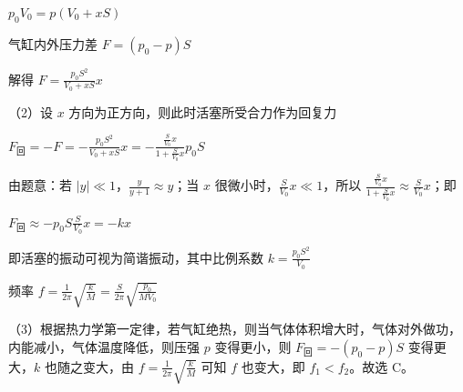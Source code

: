 \documentclass[\gkver]{gaokaozhenti}
\begin{document}
\begin{enumerate}
{$p_{0}V_{0}=p(V_{0}+xS)$

气缸内外压力差 $F=(p_{0}-p)S$

解得 $F=\frac{p_{0}S^{2}}{V_{0}+xS}x$

（2）设 $x$ 方向为正方向，则此时活塞所受合力作为回复力

$F_{\text{回}}=-F=-\frac{p_{0}S^{2}}{V_{0}+xS}x=-\frac{\frac{S}{V_{0}}x}{1+\frac{S}{V_{0}}x}p_{0}S$

由题意：若 $|y|\ll 1$，$\frac{y}{y+1}\approx y$；当 $x$ 很微小时，$\frac{S}{V_{0}}x\ll 1$，所以 $\frac{\frac{S}{V_{0}}x}{1+\frac{S}{V_{0}}x}\approx\frac{S}{V_{0}}x$；即

$F_{\text{回}}\approx -p_{0}S\frac{S}{V_{0}}x=-kx$

即活塞的振动可视为简谐振动，其中比例系数 $k=\frac{p_{0}S^{2}}{V_{0}}$

频率 $f=\frac{1}{2\pi}\sqrt{\frac{k}{M}}=\frac{S}{2\pi}\sqrt{\frac{p_{0}}{MV_{0}}}$

（3）根据热力学第一定律，若气缸绝热，则当气体体积增大时，气体对外做功，内能减小，气体温度降低，则压强 $p$ 变得更小，则 $F_{\text{回}}=-(p_{0}-p)S$ 变得更大，$k$ 也随之变大，由 $f=\frac{1}{2\pi}\sqrt{\frac{k}{M}}$ 可知 $f$ 也变大，即 $f_{1}<f_{2}$。故选 C。
}

\end{enumerate}
\end{document}
